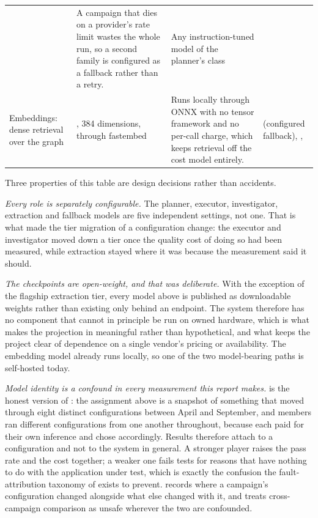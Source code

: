 \begin{xltabular}{\textwidth}{@{}>{\hsize}Y>{\hsize}Y>{\hsize}Y>{\hsize}Y@{}}
   &
  A campaign that dies on a provider's rate limit wastes the whole run, so a second family is configured as a fallback rather than a retry. &
  Any instruction-tuned model of the planner's class \\
  \addlinespace
  Embeddings: dense retrieval over the graph &
  , 384 dimensions, through fastembed &
  Runs locally through ONNX with no tensor framework and no per-call charge, which keeps retrieval off the cost model entirely. &
   (configured fallback), ,  \\
  \bottomrule
\end{xltabular}
\endgroup

Three properties of this table are design decisions rather than accidents.

\emph{Every role is separately configurable.} The planner, executor,
investigator, extraction and fallback models are five independent settings, not
one. That is what made the tier migration of  a
configuration change: the executor and investigator moved down a tier once the
quality cost of doing so had been measured, while extraction stayed where it
was because the measurement said it should.

\emph{The checkpoints are open-weight, and that was deliberate.} With the
exception of the flagship extraction tier, every model above is published as
downloadable weights rather than existing only behind an endpoint. The system
therefore has no component that cannot in principle be run on owned hardware,
which is what makes the projection in  meaningful rather
than hypothetical, and what keeps the project clear of dependence on a single
vendor's pricing or availability. The embedding model already runs locally, so
one of the two model-bearing paths is self-hosted today.

\emph{Model identity is a confound in every measurement this report makes.}
 is the honest version of : the
assignment above is a snapshot of something that moved through eight distinct
configurations between April and September, and members ran different
configurations from one another
throughout, because each paid for their own inference and chose accordingly.
Results therefore attach to a configuration and not to the system in general. A
stronger player raises the pass rate and the cost together; a weaker one fails
tests for reasons that have nothing to do with the application under test,
which is exactly the confusion the fault-attribution taxonomy of
 exists to prevent.  records where a
campaign's configuration changed alongside what else changed with it, and
treats cross-campaign comparison as unsafe wherever the two are confounded.

